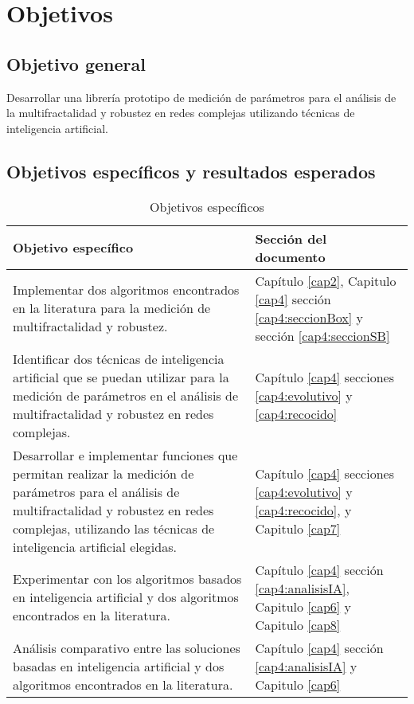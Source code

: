 \section{Objetivos}

\subsection{Objetivo general}

Desarrollar una librería prototipo de medición de parámetros para el análisis de la multifractalidad y robustez en redes complejas utilizando técnicas de inteligencia artificial.

\subsection{Objetivos espec\'ificos y resultados esperados}

\begin{table}[H]
    \centering
    \begin{tabular}{|p{11cm}|p{5cm}|}
        \hline
        \textbf{Objetivo específico} & \textbf{Sección del documento} \\
        \hline
        Implementar dos algoritmos encontrados en la literatura para la medición de multifractalidad y robustez.& Capítulo \ref{cap2}, Capitulo \ref{cap4} sección \ref{cap4:seccionBox} y sección \ref{cap4:seccionSB}\\
        \hline
        Identificar dos técnicas de inteligencia artificial que se puedan utilizar para la medición de parámetros en el análisis de multifractalidad y robustez en redes complejas.&  Capítulo \ref{cap4} secciones \ref{cap4:evolutivo} y \ref{cap4:recocido}\\
        \hline
         Desarrollar e implementar funciones que
permitan realizar la medición de parámetros para el análisis de multifractalidad y robustez en redes complejas, utilizando las técnicas de inteligencia artificial elegidas. &  Capítulo \ref{cap4} secciones \ref{cap4:evolutivo} y \ref{cap4:recocido}, y Capitulo \ref{cap7}\\
        \hline
         Experimentar con los algoritmos basados
en inteligencia artificial y dos algoritmos
encontrados en la literatura.&  Capítulo \ref{cap4} sección \ref{cap4:analisisIA}, Capitulo \ref{cap6} y Capitulo \ref{cap8}
\\
        \hline
        Análisis comparativo entre las soluciones basadas en inteligencia artificial y dos algoritmos encontrados en la literatura.  & Capítulo \ref{cap4} sección \ref{cap4:analisisIA} y Capitulo \ref{cap6}\\
        \hline
    \end{tabular}
    \caption{Objetivos específicos}
    \label{tab:objEspecificos}
\end{table}







